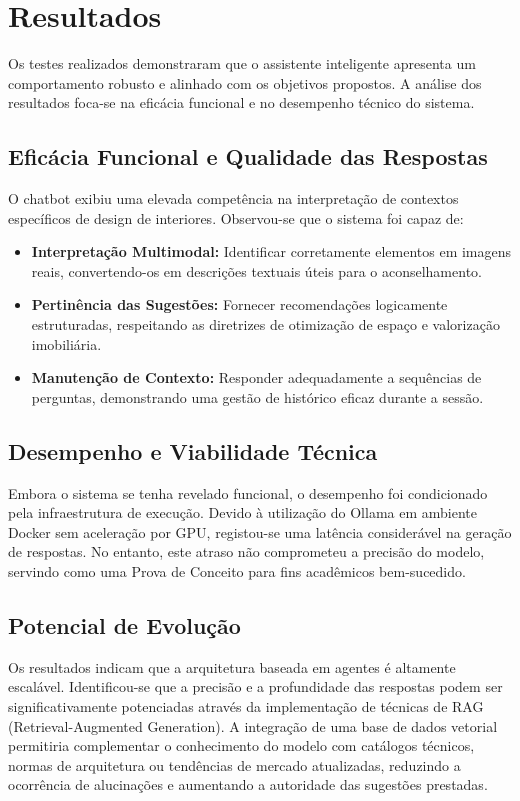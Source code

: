 \documentclass[a4paper,12pt]{scrreprt}
\begin{document}
    \section{Resultados}
        Os testes realizados demonstraram que o assistente inteligente apresenta um comportamento robusto e alinhado com os objetivos propostos. A análise dos resultados foca-se na eficácia funcional e no desempenho técnico do sistema.

        \subsection{Eficácia Funcional e Qualidade das Respostas}
        O chatbot exibiu uma elevada competência na interpretação de contextos específicos de design de interiores. Observou-se que o sistema foi capaz de:
        \begin{itemize}
            \item \textbf{Interpretação Multimodal:} Identificar corretamente elementos em imagens reais, convertendo-os em descrições textuais úteis para o aconselhamento.
            \item \textbf{Pertinência das Sugestões:} Fornecer recomendações logicamente estruturadas, respeitando as diretrizes de otimização de espaço e valorização imobiliária.
            \item \textbf{Manutenção de Contexto:} Responder adequadamente a sequências de perguntas, demonstrando uma gestão de histórico eficaz durante a sessão.
        \end{itemize}

        \subsection{Desempenho e Viabilidade Técnica}
        Embora o sistema se tenha revelado funcional, o desempenho foi condicionado pela infraestrutura de execução. Devido à utilização do Ollama em ambiente Docker sem aceleração por GPU, registou-se uma latência considerável na geração de respostas. No entanto, este atraso não comprometeu a precisão do modelo, servindo como uma Prova de Conceito para fins acadêmicos bem-sucedido.

        \subsection{Potencial de Evolução}
        Os resultados indicam que a arquitetura baseada em agentes é altamente escalável. Identificou-se que a precisão e a profundidade das respostas podem ser significativamente potenciadas através da implementação de técnicas de RAG (Retrieval-Augmented Generation). A integração de uma base de dados vetorial permitiria complementar o conhecimento do modelo com catálogos técnicos, normas de arquitetura ou tendências de mercado atualizadas, reduzindo a ocorrência de alucinações e aumentando a autoridade das sugestões prestadas.
\end{document}
